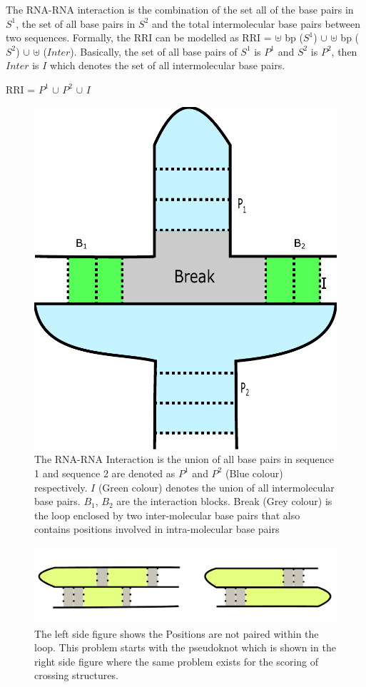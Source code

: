 \documentclass[twoside,a4paper]{report}
\begin{document}
 	The RNA-RNA interaction is the combination of the set all of the base pairs in $S^1$, the set of all base pairs in $S^2$ and the total intermolecular base pairs between two sequences. Formally, the RRI can be modelled as RRI = $ \uplus $ bp ($S^1$) $ \cup $ $\uplus$ bp ($S^2$) $\cup$ $\uplus$ ($Inter$). Basically, the set of all base pairs of $S^1$ is $P^1$ and $S^2$ is $P^2$, then $Inter$ is $I$ which denotes the set of all intermolecular base pairs. \\
 	
 		\begin{center}
 		RRI =  $P^1$ $ \cup $  $P^2$ $\cup$ $I$
 		\end{center}
 	
 
	 	\begin{figure}[tb]
		\includegraphics[width=0.4\linewidth]{rnarna.pdf}
		\centering
		\caption{The RNA-RNA Interaction is the union of all base pairs in sequence 1 and sequence 2 are denoted as $P^1$ and $P^2$ (Blue colour) respectively. $I$ (Green colour) denotes the union of all intermolecular base pairs. $B_1$, $B_2$ are the interaction blocks. Break (Grey colour) is the loop enclosed by two inter-molecular base pairs that also contains positions involved in intra-molecular base pairs}
		\label{fig:rnarna}
	\end{figure}
	
 		\begin{figure}[tb]
 		\includegraphics[width=1.0\linewidth]{pseudoknot.pdf}
 		\centering
 		\caption{ The left side figure shows the Positions are not paired within the loop. This problem starts with the pseudoknot which is shown in the right side figure where the same problem exists for the scoring of crossing structures. }
 		\label{fig:pseudoknot}
 	\end{figure}
 	
\end{document}
